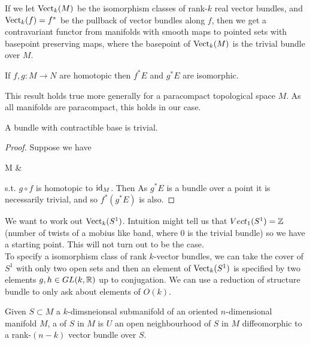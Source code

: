 \documentclass{article}
\begin{document}
\begin{remark}
	If we let $\operatorname{Vect}_k(M)$ be the isomorphism classes of rank-$k$ real vector bundles, and $\operatorname{Vect}_k(f) = f^{\ast}$ be the pullback of vector bundles along $f$, then we get a contravariant functor from manifolds with smooth maps to pointed sets with basepoint preserving maps, where the basepoint of $\operatorname{Vect}_k(M)$ is the trivial bundle over $M$.
\end{remark}

\begin{prop}
	If $f,g : M \to N$ are homotopic then $f^{\ast}E$ and $g^{\ast}E$ are isomorphic.
\end{prop}
\begin{remark}
	This result holds true more generally for a  paracompact topological space $M$. As all manifolds are paracompact, this holds in our case.
\end{remark}
\begin{corollary}
	A bundle with contractible base is trivial.
\end{corollary}
\begin{proof}
	Suppose we have 
	\begin{tkz}
		M  & \ast {}
	\end{tkz}
s.t. $g \circ f$ is homotopic to $\operatorname{id}_M$. Then 
As $g^{\ast}E$ is a bundle over a point it is necessarily trivial, and so $f^{\ast}(g^{\ast}E)$ is also.
\end{proof}

\begin{example}
	We want to work out $\operatorname{Vect}_k(S^1)$. Intuition might tell us that $Vect_1(S^1) = \mathbb{Z}$ (number of twists of a mobius like band, where 0 is the trivial bundle) so we have a starting point. This will not turn out to be the case. \\
	To specify a isomorphism class of rank $k$-vector bundles, we can take the cover of $S^1$ with only two open sets and then an element of $\operatorname{Vect}_k(S^1)$ is specified by two elements $g,h \in GL(k,\mathbb{R})$ up to conjugation. We can use a reduction of structure bundle to only ask about elements of $O(k)$. 
\end{example}

\begin{definition}
	Given $S \subset M$ a $k$-dimsneionsal submanifold of an oriented $n$-dimensional manifold $M$, a  of $S$ in $M$ is $U$ an open neighbourhood of $S$ in $M$ diffeomorphic to a rank-$(n-k)$ vector bundle over $S$. 
\end{definition}
\end{document}
